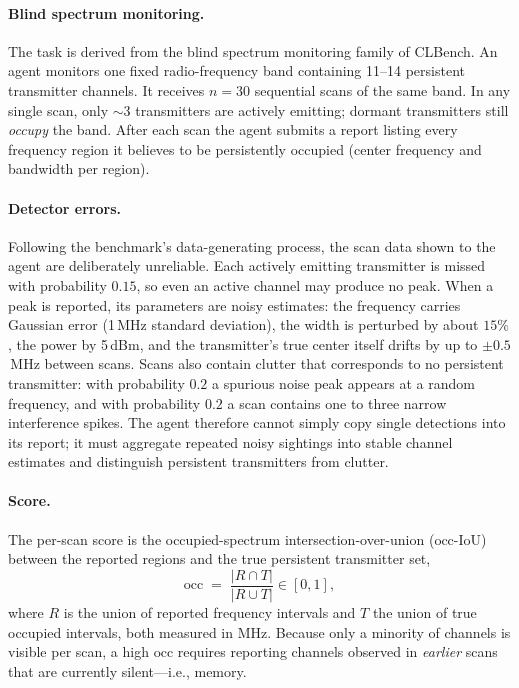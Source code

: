 \documentclass[11pt]{article}
\newcommand{\occ}{\ensuremath{\mathrm{occ}}}
\begin{document}
\paragraph{Blind spectrum monitoring.}
The task is derived from the blind spectrum monitoring family of CLBench. An agent
monitors one fixed radio-frequency band containing 11--14 persistent transmitter
channels. It receives $n{=}30$ sequential scans of the same band. In any single
scan, only ${\sim}3$ transmitters are actively emitting; dormant transmitters still
\emph{occupy} the band. After each scan the agent submits a report listing every
frequency region it believes to be persistently occupied (center frequency and
bandwidth per region).

\paragraph{Detector errors.}
Following the benchmark's data-generating process, the scan data shown to the agent
are deliberately unreliable. Each actively emitting transmitter is missed with
probability $0.15$, so even an active channel may produce no peak. When a peak is
reported, its parameters are noisy estimates: the frequency carries Gaussian error
(1\,MHz standard deviation), the width is perturbed by about $15\%$, the power by
5\,dBm, and the transmitter's true center itself drifts by up to $\pm 0.5$\,MHz
between scans. Scans also contain clutter that corresponds to no persistent
transmitter: with probability $0.2$ a spurious noise peak appears at a random
frequency, and with probability $0.2$ a scan contains one to three narrow
interference spikes. The agent therefore cannot simply copy single detections into
its report; it must aggregate repeated noisy sightings into stable channel
estimates and distinguish persistent transmitters from clutter.

\paragraph{Score.}
The per-scan score is the occupied-spectrum intersection-over-union
(\occ-IoU) between the reported regions and the true persistent transmitter set,
\begin{equation}
\occ \;=\; \frac{\lvert R \cap T \rvert}{\lvert R \cup T \rvert} \in [0,1],
\end{equation}
where $R$ is the union of reported frequency intervals and $T$ the union of true
occupied intervals, both measured in MHz. Because only a minority of channels is
visible per scan, a high \occ{} requires reporting channels observed in
\emph{earlier} scans that are currently silent---i.e., memory.
\end{document}
